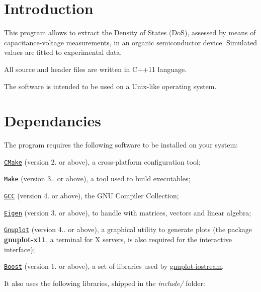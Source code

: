 \hypertarget{index_intro}{}\section{Introduction}\label{index_intro}
This program allows to extract the Density of States (Do\-S), assessed by means of capacitance-\/voltage measurements, in an organic semiconductor device. Simulated values are fitted to experimental data. \par
All source and header files are written in C++11 language. \par
The software is intended to be used on a Unix-\/like operating system.\hypertarget{index_dependancies}{}\section{Dependancies}\label{index_dependancies}
The program requires the following software to be installed on your system\-:

\begin{DoxyItemize}
\item \href{http://www.cmake.org}{\tt C\-Make} (version 2. or above), a cross-\/platform configuration tool; \item \href{http://www.gnu.org/software/make}{\tt Make} (version 3.. or above), a tool used to build executables; \item \label{index_GCC}%
\hypertarget{index_GCC}{}%
\href{http://www.gnu.org/software/gcc}{\tt G\-C\-C} (version 4. or above), the G\-N\-U Compiler Collection; \par
 \par
\item \label{index_Eigen}%
\hypertarget{index_Eigen}{}%
\href{http://eigen.tuxfamily.org}{\tt Eigen} (version 3. or above), to handle with matrices, vectors and linear algebra; \item \label{index_Gnuplot}%
\hypertarget{index_Gnuplot}{}%
\href{http://www.gnuplot.info}{\tt Gnuplot} (version 4.. or above), a graphical utility to generate plots (the package {\bfseries gnuplot-\/x11}, a terminal for X servers, is also required for the interactive interface); \item \href{http://www.boost.org}{\tt Boost} (version 1. or above), a set of libraries used by \hyperlink{index_gnuplot-iostream}{gnuplot-\/iostream}.\end{DoxyItemize}
It also uses the following libraries, shipped in the {\itshape include/} folder\-:

